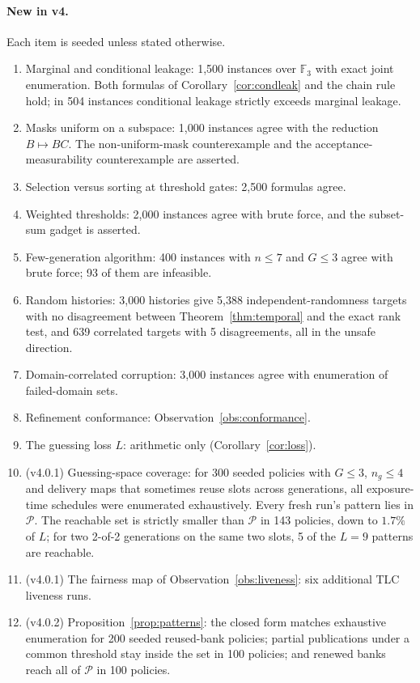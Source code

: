 \documentclass[pdflatex,sn-mathphys-num]{sn-jnl}
\theoremstyle{plain}
\theoremstyle{definition}
\newcommand{\F}{\mathbb{F}}
\begin{document}
\paragraph{New in v4.}
Each item is seeded unless stated otherwise.
\begin{enumerate}
\item Marginal and conditional leakage: 1,500 instances over $\F_3$ with exact joint enumeration. Both formulas of Corollary~\ref{cor:condleak} and the chain rule hold; in 504 instances conditional leakage strictly exceeds marginal leakage.
\item Masks uniform on a subspace: 1,000 instances agree with the reduction $B\mapsto BC$. The non-uniform-mask counterexample and the acceptance-measurability counterexample are asserted.
\item Selection versus sorting at threshold gates: 2,500 formulas agree.
\item Weighted thresholds: 2,000 instances agree with brute force, and the subset-sum gadget is asserted.
\item Few-generation algorithm: 400 instances with $n\le7$ and $G\le3$ agree with brute force; 93 of them are infeasible.
\item Random histories: 3,000 histories give 5,388 independent-randomness targets with no disagreement between Theorem~\ref{thm:temporal} and the exact rank test, and 639 correlated targets with 5 disagreements, all in the unsafe direction.
\item Domain-correlated corruption: 3,000 instances agree with enumeration of failed-domain sets.
\item Refinement conformance: Observation~\ref{obs:conformance}.
\item The guessing loss $L$: arithmetic only (Corollary~\ref{cor:loss}).
\item (v4.0.1) Guessing-space coverage: for 300 seeded policies with $G\le3$, $n_g\le4$ and delivery maps that sometimes reuse slots across generations, all exposure-time schedules were enumerated exhaustively. Every fresh run's pattern lies in $\mathcal P$. The reachable set is strictly smaller than $\mathcal P$ in 143 policies, down to $1.7\%$ of $L$; for two 2-of-2 generations on the same two slots, 5 of the $L=9$ patterns are reachable.
\item (v4.0.1) The fairness map of Observation~\ref{obs:liveness}: six additional TLC liveness runs.
\item (v4.0.2) Proposition~\ref{prop:patterns}: the closed form matches exhaustive enumeration for 200 seeded reused-bank policies; partial publications under a common threshold stay inside the set in 100 policies; and renewed banks reach all of $\mathcal P$ in 100 policies.

\end{enumerate}
\end{document}
